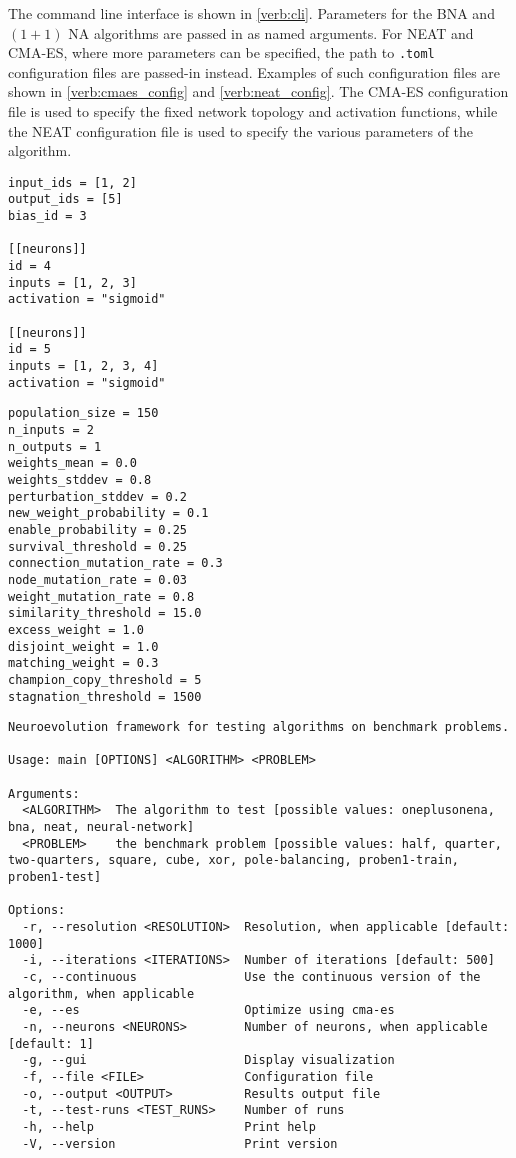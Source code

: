 The command line interface is shown in \ref{verb:cli}. Parameters for the BNA and $(1 + 1)$ NA algorithms are passed in as named arguments. For NEAT and CMA-ES, where more
parameters can be specified, the path to \texttt{.toml} configuration files are passed-in instead. Examples of such configuration files are shown in \ref{verb:cmaes_config}
and \ref{verb:neat_config}. The CMA-ES configuration file is used to specify the fixed network topology and activation functions, while the NEAT configuration file
is used to specify the various parameters of the algorithm.

\begin{lstlisting}[label=verb:cmaes_config,caption=Example of configuration File for CMAE-ES,float,frame=tb]
input_ids = [1, 2]
output_ids = [5]
bias_id = 3

[[neurons]]
id = 4
inputs = [1, 2, 3]
activation = "sigmoid"

[[neurons]]
id = 5
inputs = [1, 2, 3, 4]
activation = "sigmoid"
\end{lstlisting}

\begin{lstlisting}[label=verb:neat_config,caption=Example of configuration File for NEAT,float,frame=tb]
population_size = 150
n_inputs = 2
n_outputs = 1
weights_mean = 0.0
weights_stddev = 0.8
perturbation_stddev = 0.2
new_weight_probability = 0.1
enable_probability = 0.25
survival_threshold = 0.25
connection_mutation_rate = 0.3
node_mutation_rate = 0.03
weight_mutation_rate = 0.8
similarity_threshold = 15.0
excess_weight = 1.0
disjoint_weight = 1.0
matching_weight = 0.3
champion_copy_threshold = 5
stagnation_threshold = 1500
\end{lstlisting}

\begin{lstlisting}[label=verb:cli,caption=Command line interface,float,frame=tb]
Neuroevolution framework for testing algorithms on benchmark problems.

Usage: main [OPTIONS] <ALGORITHM> <PROBLEM>

Arguments:
  <ALGORITHM>  The algorithm to test [possible values: oneplusonena, bna, neat, neural-network]
  <PROBLEM>    the benchmark problem [possible values: half, quarter, two-quarters, square, cube, xor, pole-balancing, proben1-train, proben1-test]

Options:
  -r, --resolution <RESOLUTION>  Resolution, when applicable [default: 1000]
  -i, --iterations <ITERATIONS>  Number of iterations [default: 500]
  -c, --continuous               Use the continuous version of the algorithm, when applicable
  -e, --es                       Optimize using cma-es
  -n, --neurons <NEURONS>        Number of neurons, when applicable [default: 1]
  -g, --gui                      Display visualization
  -f, --file <FILE>              Configuration file
  -o, --output <OUTPUT>          Results output file
  -t, --test-runs <TEST_RUNS>    Number of runs
  -h, --help                     Print help
  -V, --version                  Print version
\end{lstlisting}

